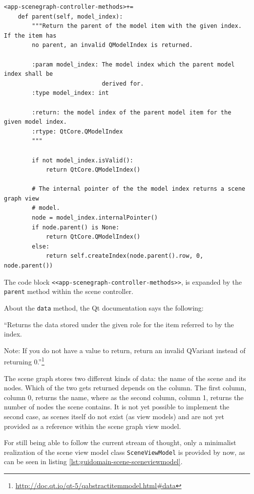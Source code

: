 \documentclass[10pt, openright, notitlepage]{scrreprt}
\begin{document}
\begin{listing}[H]
\begin{verbatim}
<app-scenegraph-controller-methods>+=
    def parent(self, model_index):
        """Return the parent of the model item with the given index. If the item has
        no parent, an invalid QModelIndex is returned.
    
        :param model_index: The model index which the parent model index shall be
                            derived for.
        :type model_index: int
    
        :return: the model index of the parent model item for the given model index.
        :rtype: QtCore.QModelIndex
        """
    
        if not model_index.isValid():
            return QtCore.QModelIndex()
    
        # The internal pointer of the the model index returns a scene graph view
        # model.
        node = model_index.internalPointer()
        if node.parent() is None:
            return QtCore.QModelIndex()
        else:
            return self.createIndex(node.parent().row, 0, node.parent())
\end{verbatim}
\caption{\label{lst:app-scenegraph-controller-methods-03}
The code block \texttt{<<app-scenegraph-controller-methods>>}, is expanded by the \texttt{parent} method within the scene controller.}
\end{listing}

About the \texttt{data} method, the Qt documentation says the following:

``Returns the data stored under the given role for the item referred to by the
index.

Note: If you do not have a value to return, return an invalid QVariant instead
of returning
0.''\footnote{\url{http://doc.qt.io/qt-5/qabstractitemmodel.html\#data}}

The scene graph stores two different kinds of data: the name of the scene and its
nodes. Which of the two gets returned depends on the column. The first column,
column 0, returns the name, where as the second column, column 1, returns the
number of nodes the scene contains. It is not yet possible to implement the
second case, as scenes itself do not exist (as view models) and are not yet
provided as a reference within the scene graph view model.

For still being able to follow the current stream of thought, only a minimalist
realization of the scene view model class \texttt{SceneViewModel} is provided
by now, as can be seen in listing \ref{lst:guidomain-scene-sceneviewmodel}.
\end{document}
